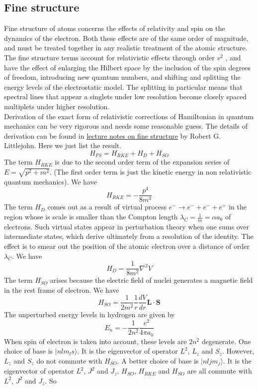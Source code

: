 \subsection{Fine structure}
Fine structure of atoms concerns the effects of relativity and spin on the dynamics of the electron. Both these effects are of the same order of magnitude, and must be treated together in any realistic treatment of the atomic structure.\\
The fine structure terms account for relativistic effects through order $v^2$ , and have the effect of enlarging the Hilbert space by the inclusion of the spin degrees of freedom, introducing new quantum numbers, and shifting and splitting the energy levels of the electrostatic model. 
The splitting in particular means that spectral lines that appear a singlets under low resolution become closely spaced multiplets under higher resolution.\\
Derivation of the exact form of relativistic corrections of Hamiltonian in quantum mechanics can be very rigorous and needs some reasonable guess. The details of derivation can be found in 
\href{http://bohr.physics.berkeley.edu/classes/221/1112/notes/finestruc.pdf}{lecture notes on fine structure} by Robert G. Littlejohn. Here we just list the result.
\[H_{FS} = H_{RKE} + H_{D} + H_{SO}\]
The term $H_{RKE}$ is due to the second order term of the expansion series of $E = \sqrt{p^2+m^2}$. (The first order term is just the kinetic energy in non relativistic quantum mechanics). We have
\[H_{RKE} = - \frac{p^4}{8m^3}\]
The term $H_{D}$ comes out as a result of virtual process $e^{-} \to e^{-} + e^{-} + e^{+}$ in the region whose is scale is smaller than the Compton length $\lambda_C = \frac{1}{m} = \alpha a_0$ of electrons. Such virtual states appear in perturbation theory when one sums over intermediate states, which derive ultimately from a resolution of the identity. The effect is to smear out the position of the atomic electron
over a distance of order $\lambda_C$. We have
\[H_D = \frac{1}{8m^2} \nabla^2 V\]
The term $H_{SO}$ arises because the electric field of nuclei generates a magnetic field in the rest frame of electron. We have
\[H_{SO} = \frac{1}{2m^2} \frac{1}{r} \frac{dV}{dr} \bm{L}\cdot\bm{S}\]
The unperturbed energy levels in hydrogen are given by
\[E_n = -\frac{1}{2n^2} \frac{e^2}{4\pi a_0}\]
When spin of electron is taken into account,  these levels are $2n^2$ degenerate. One choice of base is $|nlm_{l}s\rangle$. It is the eigenvector of operator $L^2$, $L_z$ and $S_z$. However, $L_z$ and $S_z$ do not commute with $H_{SO}$. A better choice of base is $|nljm_j\rangle$. It is the eigenvector of operator $L^2$, $J^2$ and $J_z$. $H_{SO}$, $H_{RKE}$ and $H_{SO}$ are all commute with $L^2$, $J^2$ and $J_z$. So
